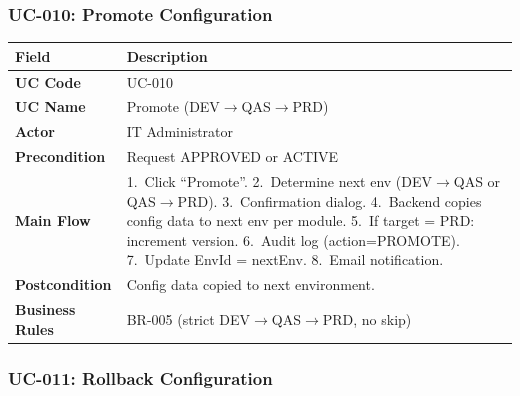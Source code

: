 \documentclass[12pt,a4paper]{report}
\begin{document}
\subsubsection{UC-010: Promote Configuration}

\begin{longtable}{|>{\bfseries}p{2.8cm}|p{12cm}|}
  \hline
  \rowcolor{tableheadpeach}
  \textbf{Field} & \textbf{Description} \\ \hline
  \endhead \hline \endfoot
  UC Code       & UC-010 \\ \hline
  UC Name       & Promote (DEV$\rightarrow$QAS$\rightarrow$PRD) \\ \hline
  Actor         & IT Administrator \\ \hline
  Precondition  & Request APPROVED or ACTIVE \\ \hline
  Main Flow     & 1.~Click ``Promote''.
                  2.~Determine next env (DEV$\rightarrow$QAS or QAS$\rightarrow$PRD).
                  3.~Confirmation dialog.
                  4.~Backend copies config data to next env per module.
                  5.~If target = PRD: increment version.
                  6.~Audit log (action=PROMOTE).
                  7.~Update EnvId = nextEnv.
                  8.~Email notification. \\ \hline
  Postcondition & Config data copied to next environment. \\ \hline
  Business Rules& BR-005 (strict DEV$\rightarrow$QAS$\rightarrow$PRD, no skip) \\ \hline
\end{longtable}

\subsubsection{UC-011: Rollback Configuration}
\end{document}
